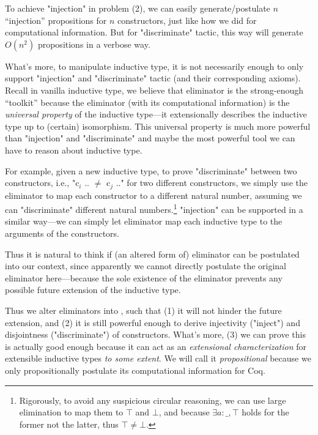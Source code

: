 To achieve "injection" in problem (2), we can easily generate/postulate
$n$ ``injection'' propositions for $n$ constructors, just like how we
did for computational information. But for "discriminate" tactic, this
way will generate $O(n^2)$ propositions in a verbose way. 

What's more, to manipulate inductive type, it is not necessarily enough
to only support "injection" and "discriminate" tactic (and their
corresponding axioms). Recall in vanilla inductive type, we believe that
eliminator is the strong-enough ``toolkit'' because the eliminator (with
its computational information) is the \textit{universal property} of the
inductive type---it extensionally describes the inductive type up to
(certain) isomorphism. This universal property is much more powerful
than "injection" and "discriminate" and maybe the most powerful tool we
can have to reason about inductive type. 

For example, given a new inductive type, to prove "discriminate" between two constructors, i.e., "c$_i$ .. $\neq$ c$_j$ .." for two different constructors, we simply use the eliminator to map each constructor to a different natural number, assuming we can "discriminate" different natural numbers.\footnote{Rigorously, to avoid any suspicious circular reasoning, we can use large elimination to map them to $\top$ and $\bot$, and because $\exists a : \_, \top$ holds for the former not the latter, thus $\top \neq \bot$.} "injection" can be supported in a similar way---we can simply let eliminator map each inductive type to the arguments of the constructors. 

Thus it is natural to think if (an altered form of) eliminator can be
postulated into our context, since apparently we cannot directly
postulate the original eliminator here---because the sole existence of
the eliminator prevents any possible future extension of the inductive
type. 

Thus we alter eliminators into , such that (1) it
will not hinder the future extension, and (2) it is still powerful
enough to derive injectivity ("inject") and disjointness ("discriminate") of constructors.
What's more, (3) we can prove this  is
actually good enough because it can act as an \textit{extensional
characterization} for extensible inductive types \textit{to some extent}.
We will call it \textit{propositional} because we only propositionally
postulate its computational information for Coq.

